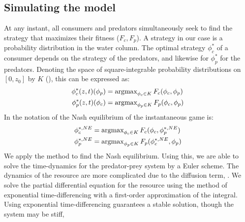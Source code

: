 \subsection{Simulating the model}




At any instant, all consumers and predators simultaneously seek to find the strategy that maximizes their fitness ($F_c, F_p$). A strategy in our case is a probability distribution in the water column. The optimal strategy $\phi_c^*$ of a consumer depends on the strategy of the predators, and likewise for $\phi_p^*$ for the predators. Denoting the space of square-integrable probability distributions on $[0,z_0]$ by $K$ (), this can be expressed as:
\begin{align*}
	\phi_c^*(z,t)(\phi_p) &= \argmax_{\phi_c \in K}  F_c(\phi_c, \phi_p)  \\
	\phi_p^*(z,t)(\phi_c) &= \argmax_{\phi_p \in K} F_p(\phi_c, \phi_p)
\end{align*}
In the notation of  the Nash equilibrium of the instantaneous game is:
\begin{align}
  \label{eq:nash_equilibria}
	\phi_c^{*,NE} &=  \argmax_{\phi_c \in K}  F_c(\phi_c, \phi_p^{*,NE}) \\
	\phi_p^{*,NE} &=  \argmax_{\phi_p \in K} F_p(\phi_c^{*,NE}, \phi_p)
\end{align}
We apply the method  to find the Nash equilibrium. Using this, we are able to solve the time-dynamics for the predator-prey system by a Euler scheme. The dynamics of the resource are more complicated due to the diffusion term, . We solve the partial differential equation for the resource using the method of exponential time-differencing with a first-order approximation of the integral. Using exponential time-differencing guarantees a stable solution, though the system may be stiff, \cite{hochbruck2010exponential}

